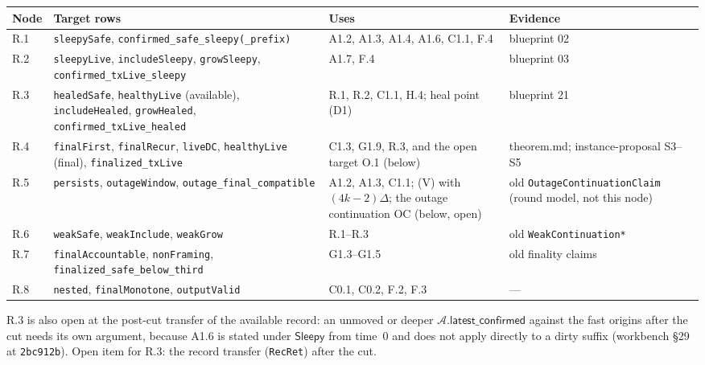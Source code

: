 \documentclass{article}
\newcommand{\AC}{\mathcal A}
\newcommand{\latestConfirmed}{\mathsf{latest\_confirmed}}
\begin{document}
\begin{longtable}{@{}>{\raggedright\arraybackslash}p{1.1cm}>{\raggedright\arraybackslash}p{5.4cm}>{\raggedright\arraybackslash}p{3.4cm}>{\raggedright\arraybackslash}p{3.3cm}@{}}
\hline
Node & Target rows & Uses & Evidence\\
\hline
R.1 & \texttt{sleepySafe}, \texttt{confirmed\_safe\_sleepy(\_prefix)} &
  A1.2, A1.3, A1.4, A1.6, C1.1, F.4 & blueprint 02\\
R.2 & \texttt{sleepyLive}, \texttt{includeSleepy}, \texttt{growSleepy},
  \texttt{confirmed\_txLive\_sleepy} & A1.7, F.4 & blueprint 03\\
R.3 & \texttt{healedSafe}, \texttt{healthyLive} (available),
  \texttt{includeHealed}, \texttt{growHealed},
  \texttt{confirmed\_txLive\_healed} & R.1, R.2, C1.1, H.4; heal point (D1) &
  blueprint 21\\
R.4 & \texttt{finalFirst}, \texttt{finalRecur}, \texttt{liveDC},
  \texttt{healthyLive} (final), \texttt{finalized\_txLive} & C1.3, G1.9,
  R.3, and the open target O.1 (below) & theorem.md;
  instance-proposal S3--S5\\
R.5 & \texttt{persists}, \texttt{outageWindow},
  \texttt{outage\_final\_compatible} & A1.2, A1.3, C1.1; (V) with
  $(4k-2)\Delta$; the outage continuation OC (below, open) & old
  \texttt{OutageContinuationClaim} (round model, not this node)\\
R.6 & \texttt{weakSafe}, \texttt{weakInclude},
  \texttt{weakGrow} & R.1--R.3 & old \texttt{WeakContinuation*}\\
R.7 & \texttt{finalAccountable}, \texttt{nonFraming},
  \texttt{finalized\_safe\_below\_third} & G1.3--G1.5 & old finality claims\\
R.8 & \texttt{nested}, \texttt{finalMonotone}, \texttt{outputValid} & C0.1,
  C0.2, F.2, F.3 & ---\\
\hline
\end{longtable}

R.3 is also open at the post-cut transfer of the available record: an unmoved
or deeper $\AC.\latestConfirmed$ against the fast origins after the cut needs its
own argument, because A1.6 is stated under $\mathsf{Sleepy}$ from time~$0$ and
does not apply directly to a dirty suffix (workbench \S29 at \texttt{2bc912b}).
Open item for R.3: the record transfer (\texttt{RecRet}) after the cut.
\end{document}
